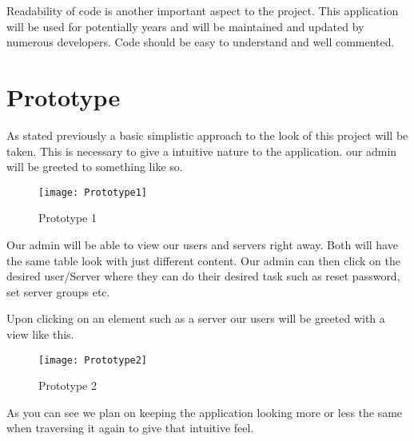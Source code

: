 Readability of code is another important aspect to the project. This application will be used for potentially years and will be maintained and updated by numerous developers. Code should be easy to understand and well commented. 

\section{Prototype}
As stated previously a basic simplistic approach to the look of this project will be taken. This is necessary to give a intuitive nature to the application. our admin will be greeted to something like so. 
\begin{figure}[ht]
  \centering
      \texttt{[image: Prototype1]}
  \caption[Prototype 1]{Prototype 1}
  \label{fig:proto1}
\end{figure}

Our admin will be able to view our users and servers right away. Both will have the same table look with just different content. Our admin can then click on the desired user/Server where they can do their desired task such as reset password, set server groups etc. 

Upon clicking on an element such as a server our users will be greeted with a view like this. 
\begin{figure}[ht]
  \centering
      \texttt{[image: Prototype2]}
  \caption[Prototype 2]{Prototype 2}
  \label{fig:proto2}
\end{figure}

As you can see we plan on keeping the application looking more or less the same when traversing it again to give that intuitive feel. 